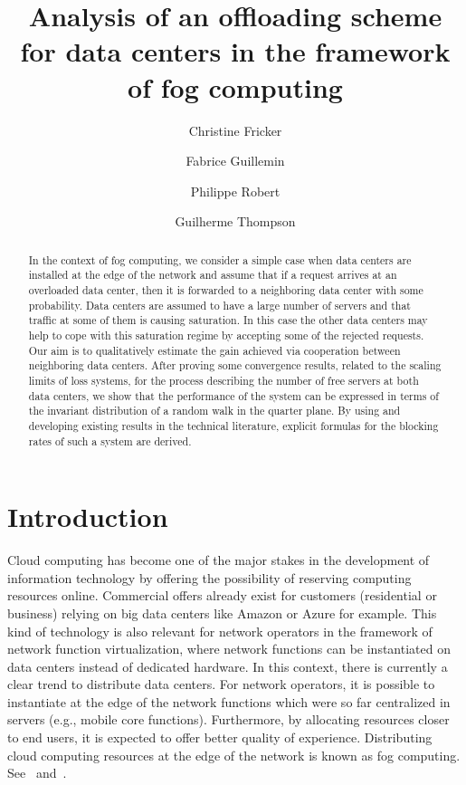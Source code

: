 \documentclass{amsart}
\title[Offloading scheme for data centers]{Analysis of an offloading scheme for data centers  in the framework of fog computing}
\author[C. Fricker]{Christine Fricker}
\author[F. Guillemin]{Fabrice Guillemin}
\author[Ph. Robert]{Philippe Robert}
\author[G. Thompson]{Guilherme Thompson}\thanks{ G. Thompson's research was supported by Brazilian Government/CAPES grant BEX 13748-13-0}
\begin{document}
\begin{abstract}
{In the context of fog computing, we consider a simple case when data centers are installed at the edge of the network and assume that if a request arrives at an overloaded data center, then it is forwarded to a neighboring data center with some probability. Data centers are assumed to have a large number of servers and that  traffic at some of them is causing saturation. In this case the other data centers may help to cope with this saturation regime by  accepting some of the rejected requests. Our aim  is to qualitatively estimate the gain achieved via cooperation between  neighboring data centers. After proving some convergence results, related to the scaling limits of loss systems, for the process describing the number of free servers at both data centers, we show that the performance of the system can be expressed in terms of the invariant distribution of a random walk in the quarter plane. By using and developing existing results in the technical literature, explicit formulas for the blocking rates of such a system are derived. }
\end{abstract}

\maketitle

\section{Introduction}

Cloud computing has become one of the major stakes in the development of information technology by offering the possibility of reserving computing resources online. Commercial offers already exist for customers (residential or business) relying on big data centers like Amazon \nocite{AmazonEC2} or Azure \nocite{Azure} for example. This kind of technology is also relevant for network operators in the framework of network function virtualization, where network functions can be instantiated on data centers instead of dedicated hardware. In this context, there is currently a clear trend to distribute data centers. For network operators, it is possible to instantiate  at the edge of the network  functions which were so far centralized in servers (e.g., mobile core functions). Furthermore, by allocating resources closer to end users, it is expected to offer better quality of experience. Distributing cloud computing resources at the edge of the network is known as fog computing. See~\cite{Bonomi,Shenker,Wood} and~\cite{Rai}.
\end{document}
